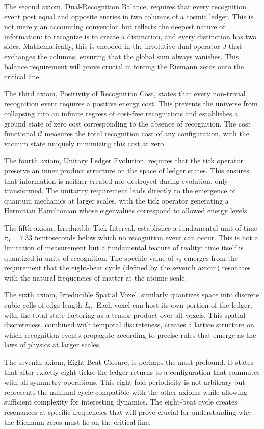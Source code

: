 \documentclass[12pt]{article}
\begin{document}
The second axiom, Dual-Recognition Balance, requires that every recognition event post equal and opposite entries in two columns of a cosmic ledger. This is not merely an accounting convention but reflects the deepest nature of information: to recognize is to create a distinction, and every distinction has two sides. Mathematically, this is encoded in the involutive dual operator $J$ that exchanges the columns, ensuring that the global sum always vanishes. This balance requirement will prove crucial in forcing the Riemann zeros onto the critical line.

The third axiom, Positivity of Recognition Cost, states that every non-trivial recognition event requires a positive energy cost. This prevents the universe from collapsing into an infinite regress of cost-free recognitions and establishes a ground state of zero cost corresponding to the absence of recognition. The cost functional $\mathcal{C}$ measures the total recognition cost of any configuration, with the vacuum state uniquely minimizing this cost at zero.

The fourth axiom, Unitary Ledger Evolution, requires that the tick operator preserve an inner product structure on the space of ledger states. This ensures that information is neither created nor destroyed during evolution, only transformed. The unitarity requirement leads directly to the emergence of quantum mechanics at larger scales, with the tick operator generating a Hermitian Hamiltonian whose eigenvalues correspond to allowed energy levels.

The fifth axiom, Irreducible Tick Interval, establishes a fundamental unit of time $\tau_0 = 7.33$ femtoseconds below which no recognition event can occur. This is not a limitation of measurement but a fundamental feature of reality: time itself is quantized in units of recognition. The specific value of $\tau_0$ emerges from the requirement that the eight-beat cycle (defined by the seventh axiom) resonates with the natural frequencies of matter at the atomic scale.

The sixth axiom, Irreducible Spatial Voxel, similarly quantizes space into discrete cubic cells of edge length $L_0$. Each voxel can host its own portion of the ledger, with the total state factoring as a tensor product over all voxels. This spatial discreteness, combined with temporal discreteness, creates a lattice structure on which recognition events propagate according to precise rules that emerge as the laws of physics at larger scales.

The seventh axiom, Eight-Beat Closure, is perhaps the most profound. It states that after exactly eight ticks, the ledger returns to a configuration that commutes with all symmetry operations. This eight-fold periodicity is not arbitrary but represents the minimal cycle compatible with the other axioms while allowing sufficient complexity for interesting dynamics. The eight-beat cycle creates resonances at specific frequencies that will prove crucial for understanding why the Riemann zeros must lie on the critical line.
\end{document}
